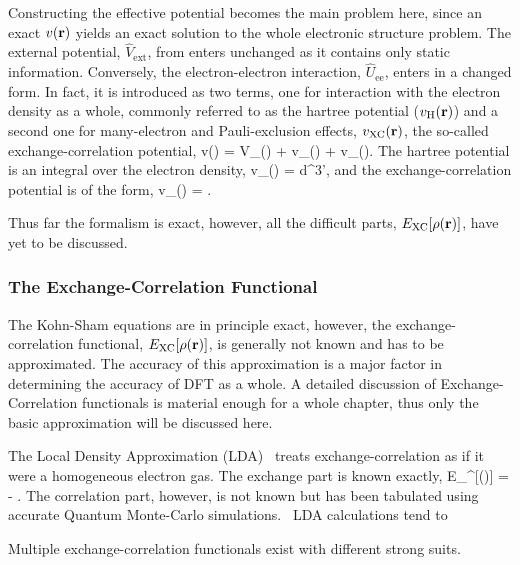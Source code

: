 Constructing the effective potential becomes the main problem here, since an exact $v({\mathrm{\mathbf{\bm{r}}}})$ yields an exact solution to the whole electronic structure problem.
The external potential, $\widehat{V}_\text{ext}$, from  enters unchanged as it contains only static information.
Conversely, the electron-electron interaction, $\widehat{U}_\text{ee}$, enters in a changed form.
In fact, it is introduced as two terms, one for interaction with the electron density as a whole, commonly referred to as the hartree potential ($v_\text{H}({\mathrm{\mathbf{\bm{r}}}})$) and a second one for many-electron and Pauli-exclusion effects, %
$v_\text{XC}({\mathrm{\mathbf{\bm{r}}}})$, the so-called exchange-correlation potential,
v(\vr) = V_(\vr) + v_(\vr) + v_(\vr).
\eeq
The hartree potential is an integral over the electron density,
v_(\vr) = \int {}d^3\vr',
\eeq
and the exchange-correlation potential is of the form,
v_(\vr) = .
\eeq

Thus far the formalism is exact, however, all the difficult parts, $E_\text{XC}[\rho({\mathrm{\mathbf{\bm{r}}}})]$, have yet to be discussed.

\subsubsection{The Exchange-Correlation Functional}
The Kohn-Sham equations are in principle exact, however, the exchange-correlation functional, $E_\text{XC}[\rho({\mathrm{\mathbf{\bm{r}}}})]$, is generally not known and has to be approximated.
The accuracy of this approximation is a major factor in determining the accuracy of DFT as a whole.
A detailed discussion of Exchange-Correlation functionals is material enough for a whole chapter, thus only the basic approximation will be discussed here.

The Local Density Approximation (LDA)~\cite{kohn-sham-1965} treats exchange-correlation as if it were a homogeneous electron gas.
The exchange part is known exactly,
E_^[\rho(\vr)] = -   \int {}.
\eeq
The correlation part, however, is not known but has been tabulated using accurate Quantum Monte-Carlo simulations.~\citemiss
LDA calculations tend to \expand

Multiple exchange-correlation functionals exist with different strong suits.
\expand


